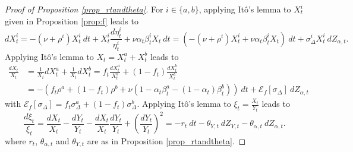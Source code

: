 \documentclass[preprint,11pt,authoryear]{elsarticle}
\theoremstyle{plain}
\begin{document}
\begin{proof}[Proof of Proposition \ref{prop_rtandtheta}]
For $i \in \{a,b\}$, applying It\^o's lemma to $X_t^i$ given in Proposition \ref{prop:f} leads to
%
\begin{equation}
    dX^i_t = -\left(\nu +\rho^i\right) X^i_t \: dt + X^i_t \frac{d\eta_t^i}{\eta_t^i} + \nu \alpha_t \beta_t^i X_t \: dt  = \left( -\left(\nu +\rho^i\right) X^i_t + \nu \alpha_t \beta_t^i X_t \right) \: dt 
    +    \sigma_{\Delta}^i   X_t^i \:  dZ_{\alpha,t}.
\end{equation}
%
Applying It\^o's lemma to $X_t=X_t^a + X_t^b$ leads to
%
\begin{equation}
 \begin{split}
    \frac{dX_t}{X_t} &=  \frac{1}{X_t}  dX^a_t  +  \frac{1}{X_t} dX^b_t = f_t \frac{dX^a_t}{X^a_t} + (1-f_t) \frac{dX^b_t}{X^b_t} \\
    &=-\left( f_t\rho^a + \left(1-f_t\right)\rho^b + \nu \left(1-\alpha_t \beta^a_t - \left(1-\alpha_t\right)\beta^b_t \right)\right) \: dt + \mathcal{E}_{f}\left [ \sigma_{\Delta}  \right] \: dZ_{\alpha,t} 
 \end{split}   
\end{equation}
with $\mathcal{E}_{f} \left [ \sigma_{\Delta} \right] = f_t \sigma_{\Delta}^a  + \left(1-f_t\right)\sigma_{\Delta}^b$. Applying It\^o's lemma to $\xi_t = \frac{X_t}{Y_t}$ leads to
%
\begin{equation}
 \frac{d\xi_t}{\xi_t} =  \frac{dX_t}{X_t} - \frac{dY_t}{Y_t} - \frac{dX_t}{X_t} \frac{dY_t}{Y_t} + \left( \frac{dY_t}{Y_t} \right)^2 = -r_t \: dt - \theta_{Y,t} \: dZ_{Y,t}  - \theta_{\alpha,t} \: dZ_{\alpha,t}.
\end{equation}
where $r_t$, $\theta_{\alpha,t}$ and $\theta_{Y,t}$ are as in Proposition \ref{prop_rtandtheta}.
%
\end{proof}



 
\end{document}
